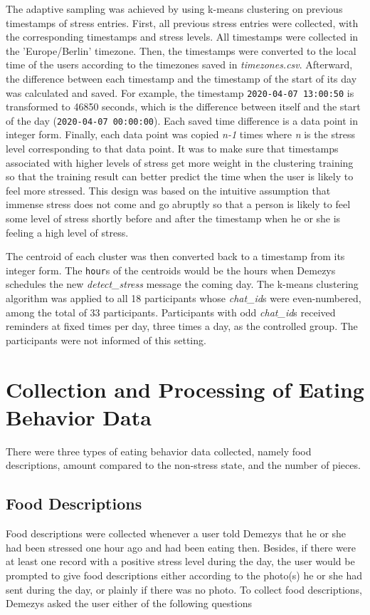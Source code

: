 The adaptive sampling was achieved by using k-means clustering on previous timestamps of stress entries. First, all previous stress entries were collected, with the corresponding timestamps and stress levels. All timestamps were collected in the 'Europe/Berlin' timezone. Then, the timestamps were converted to the local time of the users according to the timezones saved in \emph{timezones.csv}. Afterward, the difference between each timestamp and the timestamp of the start of its day was calculated and saved. For example, the timestamp \texttt{2020-04-07 13:00:50} is transformed to 46850 seconds, which is the difference between itself and the start of the day (\texttt{2020-04-07 00:00:00}). Each saved time difference is a data point in integer form. Finally, each data point was copied \emph{n-1} times where \emph{n} is the stress level corresponding to that data point. It was to make sure that timestamps associated with higher levels of stress get more weight in the clustering training so that the training result can better predict the time when the user is likely to feel more stressed. This design was based on the intuitive assumption that immense stress does not come and go abruptly so that a person is likely to feel some level of stress shortly before and after the timestamp when he or she is feeling a high level of stress.

The centroid of each cluster was then converted back to a timestamp from its integer form. The \texttt{hour}s of the centroids would be the hours when Demezys schedules the new \emph{detect\_stress} message the coming day. The k-means clustering algorithm was applied to all 18 participants whose \emph{chat\_id}s were even-numbered, among the total of 33 participants. Participants with odd \emph{chat\_id}s received reminders at fixed times per day, three times a day, as the controlled group. The participants were not informed of this setting.

\section{Collection and Processing of Eating Behavior Data}
There were three types of eating behavior data collected, namely food descriptions, amount compared to the non-stress state, and the number of pieces.

\subsection{Food Descriptions}
Food descriptions were collected whenever a user told Demezys that he or she had been stressed one hour ago and had been eating then. Besides, if there were at least one record with a positive stress level during the day, the user would be prompted to give food descriptions either according to the photo(s) he or she had sent during the day, or plainly if there was no photo. To collect food descriptions, Demezys asked the user either of the following questions

